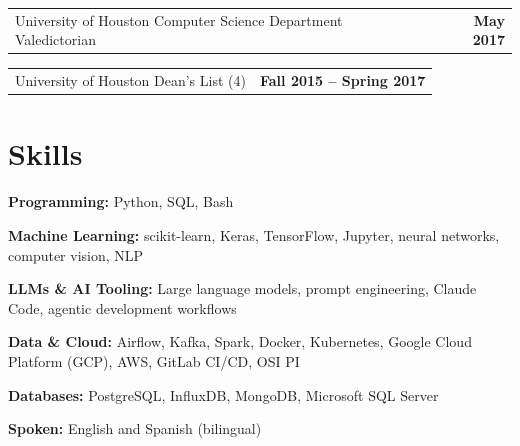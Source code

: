 \documentclass[10pt,letterpaper]{article}
\makeatletter
\newlength{\entryindent}
\newcommand{\plainrow}[2]{%
  \hspace*{\entryindent}%
  \begin{minipage}{\dimexpr\linewidth-\entryindent\relax}
    \begin{tabular*}{\linewidth}{@{}l@{\extracolsep{\fill}}r@{}}
      #1 & \textbf{#2}
    \end{tabular*}
  \end{minipage}%
  \par
}
\newcommand{\skillrow}[2]{%
  \hspace*{\entryindent}%
  \begin{minipage}{\dimexpr\linewidth-\entryindent\relax}
    \textbf{#1:} #2
  \end{minipage}%
  \par\vspace{1pt}
}
\makeatother
\begin{document}
\plainrow{University of Houston Computer Science Department Valedictorian}{May 2017}
\plainrow{University of Houston Dean's List (4)}{Fall 2015 -- Spring 2017}

\section*{Skills}
\vspace{3pt}

\skillrow{Programming}{Python, SQL, Bash}
\skillrow{Machine Learning}{scikit-learn, Keras, TensorFlow, Jupyter, neural networks, computer vision, NLP}
\skillrow{LLMs \& AI Tooling}{Large language models, prompt engineering, Claude Code, agentic development workflows}
\skillrow{Data \& Cloud}{Airflow, Kafka, Spark, Docker, Kubernetes, Google Cloud Platform (GCP), AWS, GitLab CI/CD, OSI PI}
\skillrow{Databases}{PostgreSQL, InfluxDB, MongoDB, Microsoft SQL Server}
\skillrow{Spoken}{English and Spanish (bilingual)}
\end{document}
